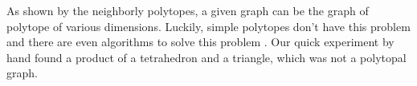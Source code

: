  As shown by the neighborly polytopes, a given graph can be the graph of polytope of various dimensions. 
Luckily, simple polytopes don't have this problem and there are even algorithms to solve this problem \cite{KALAI1988381} \cite{Achatz2000}. 
Our quick experiment by hand found a product of a tetrahedron and a triangle, which was not a polytopal graph.



















